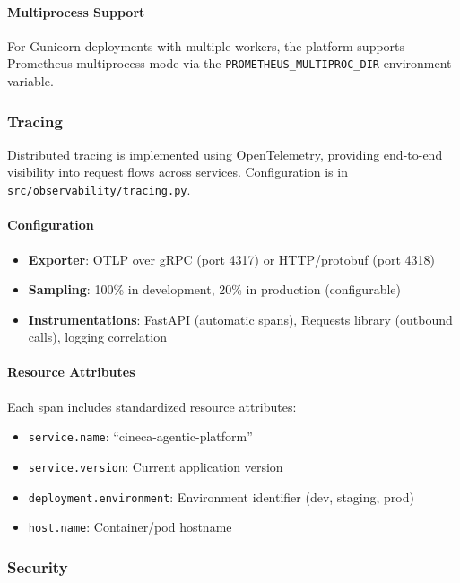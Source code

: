 \paragraph{Multiprocess Support}
For Gunicorn deployments with multiple workers, the platform supports Prometheus multiprocess mode via the \texttt{PROMETHEUS\_MULTIPROC\_DIR} environment variable.

\subsubsection{Tracing}

Distributed tracing is implemented using OpenTelemetry, providing end-to-end visibility into request flows across services. Configuration is in \texttt{src/observability/tracing.py}.

\paragraph{Configuration}
\begin{itemize}
    \item \textbf{Exporter}: OTLP over gRPC (port 4317) or HTTP/protobuf (port 4318)
    \item \textbf{Sampling}: 100\% in development, 20\% in production (configurable)
    \item \textbf{Instrumentations}: FastAPI (automatic spans), Requests library (outbound calls), logging correlation
\end{itemize}

\paragraph{Resource Attributes}
Each span includes standardized resource attributes:
\begin{itemize}
    \item \texttt{service.name}: ``cineca-agentic-platform''
    \item \texttt{service.version}: Current application version
    \item \texttt{deployment.environment}: Environment identifier (dev, staging, prod)
    \item \texttt{host.name}: Container/pod hostname
\end{itemize}

\subsubsection{Security}

